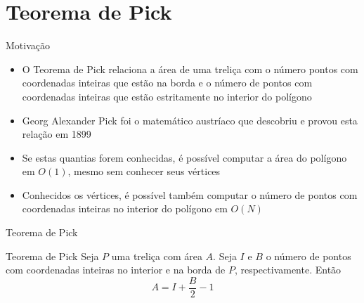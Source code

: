\section{Teorema de Pick}

\begin{frame}[fragile]{Motivação}

    \begin{itemize}
        \item O Teorema de Pick relaciona a área de uma treliça com o número pontos com
            coordenadas inteiras que estão na borda e o número de pontos com coordenadas 
            inteiras que estão estritamente no interior do polígono
        \pause

        \item Georg Alexander Pick foi o matemático austríaco que descobriu e provou esta
            relação em 1899
        \pause

        \item Se estas quantias forem conhecidas, é possível computar a área do polígono em
            $O(1)$, mesmo sem conhecer seus vértices
        \pause

        \item Conhecidos os vértices, é possível também computar o número de pontos com 
            coordenadas inteiras no interior do polígono em $O(N)$
    \end{itemize}
    
\end{frame}

\begin{frame}[fragile]{Teorema de Pick}

    \begin{block}{Teorema de Pick}
        Seja $P$ uma treliça com área $A$. Seja $I$ e $B$ o número de pontos com coordenadas
            inteiras no interior e na borda de $P$, respectivamente. Então
            \[
                A = I + \frac{B}{2} - 1
            \]
    \end{block}

\end{frame}

